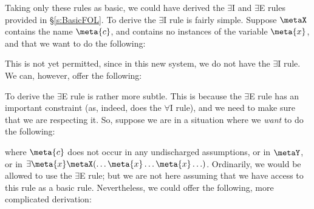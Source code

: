 Taking only these rules as basic, we could have derived the  $\exists$I and $\exists$E rules provided in \S\ref{s:BasicFOL}. To derive the $\exists$I rule is fairly simple. Suppose $\metaX$ contains the name $\meta{c}$, and contains no instances of the variable $\meta{x}$, and that we want to do the following:
\begin{fitchproof}
\end{fitchproof}
This is not yet permitted, since in this new system, we do not have the $\exists$I rule. We can, however, offer the following:
\begin{fitchproof}
	\open
	\close
\end{fitchproof}\noindent
To derive the $\exists$E rule is rather more subtle. This is because the $\exists$E rule has an important constraint (as, indeed, does the $\forall$I rule), and we need to make sure that we are respecting it. So, suppose we are in a situation where we \emph{want} to do the following:
\begin{fitchproof}
	\open
	\close
\end{fitchproof}\noindent
 where $\meta{c}$ does not occur in any undischarged assumptions, or in $\metaY$, or in $\exists \meta{x} \metaX(\ldots \meta{x} \ldots \meta{x}\ldots)$. Ordinarily, we would be allowed to use the $\exists$E rule; but we are not here assuming that we have access to this rule as a basic rule. Nevertheless, we could offer the following, more complicated derivation:
 
